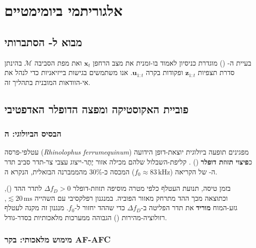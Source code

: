 
\section{אלגוריתמי  ביומימטיים}
\label{sec:slam}

\subsection{מבוא ל- הסתברותי}
בעיית ה- () מוגדרת כניסיון לאמוד בו-זמנית את מצב הרחפן $\mathbf{x}_t$ ואת מפת הסביבה $\mathcal{M}$ בהינתן סדרת תצפיות $\mathbf{z}_{1:t}$ ופקודות בקרה $\mathbf{u}_{1:t}$. אנו משתמשים בגישות בייזיאניות כדי לנהל את אי-הוודאות המובנית בתהליך זה. \cite{Thrun2005ProbRobotics}

\subsection{פוביית האקוסטיקה ומפצה הדופלר האדפטיבי}
\label{subsec:acoustic_fovea}

\subsubsection{הבסיס הביולוגי: ה}
\label{subsubsec:fovea_bio}

עטלפי-פרסה (\textit{Rhinolophus ferrumequinum}) מפגינים תופעה ביולוגית
יוצאת-דופן הידועה כ\textbf{פיצוי תזוזת דופלר}
() \cite{Schnitzler1968DSC}.
קליפת-השבלול שלהם מכילה אזור יֶתֶר-ייצוג עצבי צר-תדר
סביב תדר ה- של הקריאה ($f_0 \approx 83\,\text{kHz}$)
המכסה כ-30\% מהממברנה הבזאלית, הנקרא ה\textbf{}.

בזמן טיסה, תנועת העטלף כלפי מטרה מוסיפה תזוזת-דופלר $\Delta f_D > 0$
לתדר ההד (), וכתוצאה מכך ההד מתרחק מאזור הפוביה.
במנגנון רפלקסיבי עם השהייה $\lesssim 20\,\text{ms}$,
גזע-המוח \textbf{מוריד} את תדר הפליטה ב-$\Delta f_D$
כדי שההד יחזור ל-$f_0$. \cite{Schuller1974DSC}
מנגנון זה מקנה לעטלף רזולוציה-מהירות ()
הגבוהה ממערכות  מלאכותיות בסדר-גודל.

\subsubsection{מימוש מלאכותי: בקר AF-AFC}
\label{subsubsec:afafc}

